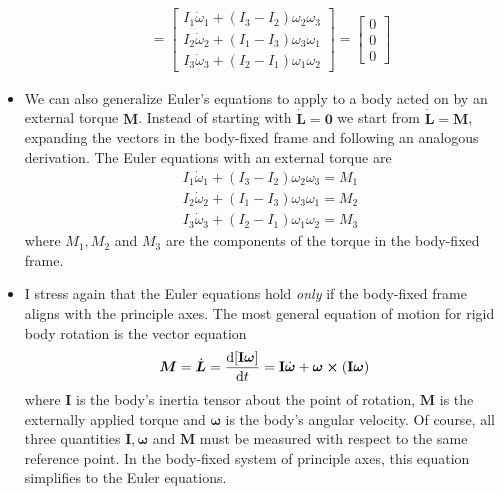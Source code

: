 \documentclass[11pt, a4paper]{article}
\newcommand{\bdot}[1]{\dot{\bm{#1}}} %
\newcommand{\mat}[1]{\mathbf{#1}} %
\begin{document}
\begin{itemize}
\begin{align*}
		&=
		\begin{bmatrix}
			I_{1}{\dot  {\omega }}_{{1}} + (I_{3}-I_{2}) \omega_{2} \omega_{3}\\
			I_{2}{\dot  {\omega}}_{{2}} + (I_{1}-I_{3}) \omega_{3} \omega_{1}\\
			I_{3}{\dot  {\omega }}_{{3}} + (I_{2}-I_{1}) \omega _{1} \omega_{2}
		\end{bmatrix}
		=
		\begin{bmatrix}
			0\\
			0\\
			0
		\end{bmatrix}
	\end{align*}

	
	\item We can also generalize Euler's equations to apply to a body acted on by an external torque $ \bm{M}$. Instead of starting with $ \bdot{L} = \bm{0} $ we start from $ \bdot{L} = \bm{M} $, expanding the vectors in the body-fixed frame and following an analogous derivation. The Euler equations with an external torque are
	\begin{align*}
		&I_{1}{\dot{\omega}}_{{1}} + (I_{3}-I_{2}) \omega_{2}\omega_{3} = M_1\\
		&I_{2}{\dot{\omega}}_{{2}} + (I_{1}-I_{3}) \omega_{3}\omega_{1} = M_2\\
		&I_{3}{\dot{\omega}}_{{3}} + (I_{2}-I_{1}) \omega_{1}\omega_{2} = M_3
	\end{align*}
	where $ M_{1}, M_{2} $ and $ M_{3} $ are the components of the torque in the body-fixed frame.
	
	\item I stress again that the Euler equations hold \textit{only} if the body-fixed frame aligns with the principle axes. The most general equation of motion for rigid body rotation is the vector equation
	\begin{equation*}
		\bm{M} = \dot{\bm{L}} = \dv{[\mathbf{I} \bm{\omega}]}{t}  = \mathbf{I} \dot{\bm{\omega}} + \bm{\omega} \cross (\mathbf{I} \bm{\omega})
	\end{equation*}
	where $ \mathbf{I} $ is the body's inertia tensor about the point of rotation, $ \bm{M} $ is the externally applied torque and $ \bm{\omega} $ is the body's angular velocity. Of course, all three quantities $ \mat{I}, \bm{\omega} $ and $ \bm{M} $ must be measured with respect to the same reference point. In the body-fixed system of principle axes, this equation simplifies to the Euler equations.

\end{itemize}
\end{document}
